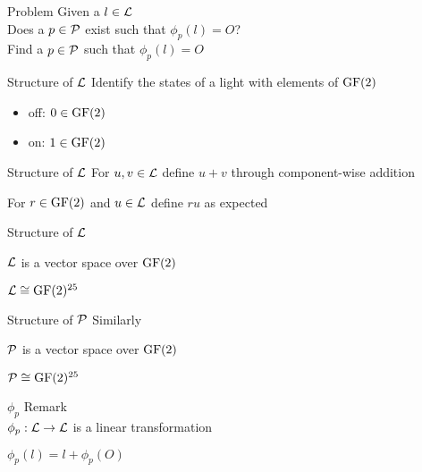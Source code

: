 \begin{frame}{Problem}
	Given a $l \in \mathcal{L}$\\
	Does a $p \in \mathcal{P}$ exist such that $\phi_{p}(l) = O$?\\
	
	\pause
	\bigskip
	Find a $p \in \mathcal{P}$ such that $\phi_{p}(l) = O$
\end{frame}

\begin{frame}{Structure of $\mathcal{L}$}
	Identify the states of a light with elements of $\operatorname{GF}(2)$
	\begin{itemize}
		\item off: $0 \in \operatorname{GF}(2)$
		\item on: $1 \in \operatorname{GF}(2)$
	\end{itemize}
\end{frame}

\begin{frame}{Structure of $\mathcal{L}$}
	For $u, v \in \mathcal{L}$ define $u + v$ through component-wise addition
	
	\pause
	\bigskip
	For $r \in \operatorname{GF}(2)$ and $u \in \mathcal{L}$ define $ru$ as expected
\end{frame}

\begin{frame}{Structure of $\mathcal{L}$}
	\begin{theorem}
		$\mathcal{L}$ is a vector space over $\operatorname{GF}(2)$
	\end{theorem}
	
	\pause
	\bigskip
	\begin{corollary}
		$\mathcal{L} \cong \operatorname{GF}(2)^{25}$
	\end{corollary}
\end{frame}

\begin{frame}{Structure of $\mathcal{P}$}
	Similarly
	
	\begin{theorem}
		$\mathcal{P}$ is a vector space over $\operatorname{GF}(2)$
	\end{theorem}
	
	\pause
	\bigskip	
	\begin{corollary}
		$\mathcal{P} \cong \operatorname{GF}(2)^{25}$
	\end{corollary}
\end{frame}

\begin{frame}{$\phi_{p}$}
	Remark\\
	$\phi_{p} : \mathcal{L} \rightarrow \mathcal{L}$ is  a linear transformation
	
	\pause
	\bigskip
	$\phi_{p}(l) = l + \phi_{p}(O)$
\end{frame}

